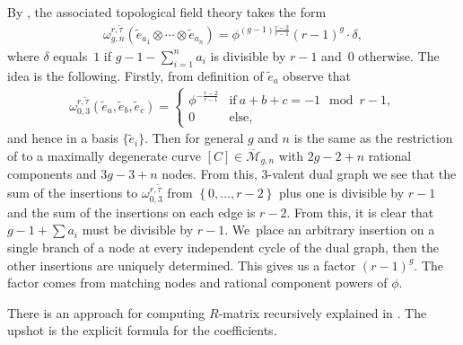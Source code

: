 \documentclass[pdftex]{sigma}
\def\oM{\overline{\mathcal{M}}}
\numberwithin{equation}{section}
\begin{document}
By \cite[Proposition 4.2]{PPZ16}, the associated topological field theory takes the form
 \begin{align}
 \label{top}
\omega^{r,\widetilde{\tau}}_{g,n} (\widetilde{e}_{a_1}\otimes \cdots \otimes \widetilde{e}_{a_n})
= \phi^{(g-1)\frac{r-2}{r-1}}(r-1)^g \cdot \delta ,
\end{align}
where $\delta$ equals~$1$ if $g-1-\sum_{i=1}^n a_i$ is divisible by $r-1$ and~$0$ otherwise.
The idea is the following. Firstly, from definition of $\widetilde{e}_a$ observe that
\begin{align*}
\omega^{r,\widetilde{\tau}}_{0,3}(\widetilde{e}_{a},\widetilde{e}_{b},\widetilde{e}_{c}) =
\begin{cases}
\phi^{-\frac{r-2}{r-1}} & \text{if} \ a+b+c =-1 \mod r-1 ,\\
0 & \text{else},
\end{cases}
\end{align*}
and hence  in a basis $\{\tilde{e}_i\}$.
Then  for general $g$ and $n$ is the same as the restriction of  to a maximally degenerate curve $[C]\in \oM_{g,n}$ with $2g-2+n$ rational components and $3g-3+n$ nodes.
From this, 3-valent dual graph we see that the sum of the insertions to $\omega^{r,\widetilde{\tau}}_{0,3}$ from $\left\{0,\dots,r-2\right\}$ plus one is divisible by $r-1$ and the sum of the insertions on each edge is $r-2$. From this, it is clear that $g-1+\sum a_i$ must be divisible by
$r-1$. We~place an arbitrary insertion on a single branch of a node at every independent cycle of the dual graph, then the other insertions are uniquely determined. This gives us a factor $(r-1)^g$. The factor  comes from matching nodes and
rational component powers of $\phi$.

There is an approach for computing $R$-matrix recursively explained in \cite[Proposition~4.4]{PPZ16}. The upshot is the explicit formula for the coefficients.
\end{document}
